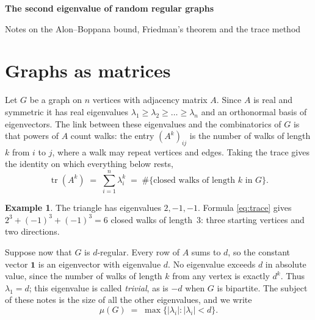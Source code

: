 \documentclass[11pt,letterpaper]{article}
\theoremstyle{definition}
\newtheorem{example}[theorem]{Example}
\theoremstyle{remark}
\DeclareMathOperator{\tr}{tr}
\newcommand{\edge}{2\sqrt{d-1}}
\newcommand{\eps}{\varepsilon}
\newcommand{\one}{\mathbf{1}}
\begin{document}
\begin{center}
  {\LARGE\bfseries The second eigenvalue of random regular graphs\par}
  \vspace{6pt}
  {\large Notes on the Alon--Boppana bound, Friedman's theorem and the trace method\par}
\end{center}
\vspace{10pt}

\begin{abstract}
\noindent
A random $d$-regular graph has all of its non-trivial adjacency eigenvalues in the interval
$[-\edge-\eps,\ \edge+\eps]$ with high probability, and no large $d$-regular graph can do
better. These notes explain why $\edge$ is the barrier, why it is hard to prove that random
graphs reach it, and how the known proofs get around the difficulty. The emphasis is on
motivation and on the shape of the arguments; proofs are sketched, not given in full.
\end{abstract}

\section{Graphs as matrices}

Let $G$ be a graph on $n$ vertices with adjacency matrix $A$. Since $A$ is real and symmetric it
has real eigenvalues $\lambda_1\ge\lambda_2\ge\dots\ge\lambda_n$ and an orthonormal basis of
eigenvectors. The link between these eigenvalues and the combinatorics of $G$ is that powers of
$A$ count walks: the entry $(A^k)_{ij}$ is the number of walks of length $k$ from $i$ to $j$, where
a walk may repeat vertices and edges. Taking the trace gives the identity on which everything
below rests,
\begin{equation}\label{eq:trace}
  \tr(A^k)\;=\;\sum_{i=1}^{n}\lambda_i^{k}\;=\;\#\{\text{closed walks of length }k\text{ in }G\}.
\end{equation}

\begin{example}
The triangle has eigenvalues $2,-1,-1$. Formula \eqref{eq:trace} gives $2^3+(-1)^3+(-1)^3=6$
closed walks of length~$3$: three starting vertices and two directions.
\end{example}

Suppose now that $G$ is $d$-regular. Every row of $A$ sums to $d$, so the constant vector $\one$ is
an eigenvector with eigenvalue $d$. No eigenvalue exceeds $d$ in absolute value, since the number
of walks of length $k$ from any vertex is exactly $d^k$. Thus $\lambda_1=d$; this eigenvalue is
called \emph{trivial}, as is $-d$ when $G$ is bipartite. The subject of these notes is the size of
all the other eigenvalues, and we write
\[
  \mu(G)\;=\;\max\{|\lambda_i| : |\lambda_i|<d\}.
\]
\end{document}
